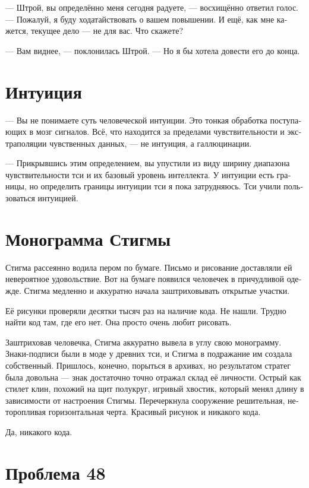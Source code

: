 \documentclass[a4paper,12pt,fleqn]{book}\usepackage{cooltooltips}\usepackage{polyglossia}\setdefaultlanguage[babelshorthands=true]{russian}\setotherlanguage{english}\defaultfontfeatures{Ligatures=TeX,Mapping=tex-text} \usepackage{xcolor}\definecolor{lightgray}{HTML}{bbbbbb}\color{lightgray}\newcommand{\ml}[3]{\textenglish{\textcolor{black}{#3}}}
\begin{document}
{--- Штрой, вы определённо меня сегодня радуете, --- восхищённо ответил голос.
--- Пожалуй, я буду ходатайствовать о вашем повышении.
И ещё, как мне кажется, текущее дело --- не для вас.
Что скажете?

--- Вам виднее, --- поклонилась Штрой.
--- Но я бы хотела довести его до конца.

\section{Интуиция}

--- Вы не понимаете суть человеческой интуиции.
Это тонкая обработка поступающих в мозг сигналов.
Всё, что находится за пределами чувствительности и экстраполяции чувственных данных, --- не интуиция, а галлюцинации.

--- Прикрывшись этим определением, вы упустили из виду ширину диапазона чувствительности тси и их базовый уровень интеллекта.
У интуиции есть границы, но определить границы интуиции тси я пока затрудняюсь.
Тси учили пользоваться интуицией.

\section{Монограмма Стигмы}

Стигма рассеянно водила пером по бумаге.
Письмо и рисование доставляли ей невероятное удовольствие.
Вот на бумаге появился человечек в причудливой одежде.
Стигма медленно и аккуратно начала заштриховывать открытые участки.

Её рисунки проверяли десятки тысяч раз на наличие кода.
Не нашли.
Трудно найти код там, где его нет.
Она просто очень любит рисовать.

Заштриховав человечка, Стигма аккуратно вывела в углу свою монограмму.
Знаки-подписи были в моде у древних тси, и Стигма в подражание им создала собственный.
Пришлось, конечно, порыться в архивах, но результатом стратег была довольна --- знак достаточно точно отражал склад её личности.
Острый как стилет клин, похожий на щит полукруг, игривый хвостик, который менял длину в зависимости от настроения Стигмы.
Перечеркнула сооружение решительная, неторопливая горизонтальная черта.
Красивый рисунок и никакого кода.

Да, никакого кода.

\section{Проблема 48}

}
\end{document}
